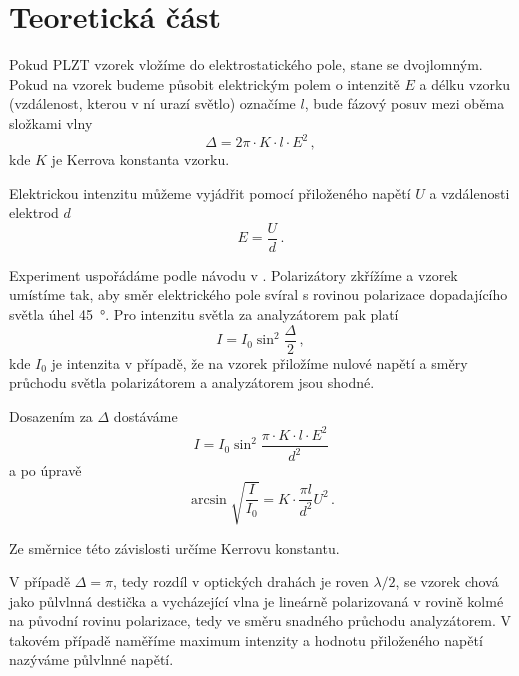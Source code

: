 \section*{Teoretická část}
Pokud PLZT vzorek vložíme do elektrostatického pole, stane se dvojlomným.
Pokud na vzorek budeme působit elektrickým polem o intenzitě $E$ a délku vzorku (vzdálenost, kterou v ní urazí světlo) označíme $l$, bude fázový posuv mezi oběma složkami vlny \cite{zfp}
\begin{equation}
\Delta = 2\pi \cdot K \cdot l \cdot E^2 \,,
\end{equation}
kde $K$ je Kerrova konstanta vzorku.

Elektrickou intenzitu můžeme vyjádřit pomocí přiloženého napětí $U$ a vzdálenosti elektrod $d$
\begin{equation}
E=\frac{U}{d} \,.
\end{equation}

Experiment uspořádáme podle návodu v \cite{zfp}. Polarizátory zkřížíme a vzorek umístíme tak, aby směr elektrického pole svíral s rovinou polarizace dopadajícího světla úhel \SI{45}{\degree}. Pro intenzitu světla za analyzátorem pak platí \cite{zfp}
\begin{equation}
I=I_0 \sin^2 \frac{\Delta}{2} \,,
\end{equation}
kde $I_0$ je intenzita v případě, že na vzorek přiložíme nulové napětí a směry průchodu světla polarizátorem a analyzátorem jsou shodné.

Dosazením za $\Delta$ dostáváme
\begin{equation}
I=I_0 \sin^2 \frac{\pi \cdot K \cdot  l \cdot E^2}{d^2}
\end{equation}
a po úpravě
\begin{equation} \label{e:fit}
\arcsin \sqrt{\frac{I}{I_0}} = K \cdot \frac{\pi l}{d^2} U^2 \,.
\end{equation}

Ze směrnice této závislosti určíme Kerrovu konstantu.

V případě $\Delta = \pi$, tedy rozdíl v optických drahách je roven $\lambda/2$, se vzorek chová jako půlvlnná destička a vycházející vlna je lineárně polarizovaná v rovině kolmé na původní rovinu polarizace, tedy ve směru snadného průchodu analyzátorem. V takovém případě naměříme maximum intenzity a hodnotu přiloženého napětí nazýváme půlvlnné napětí.